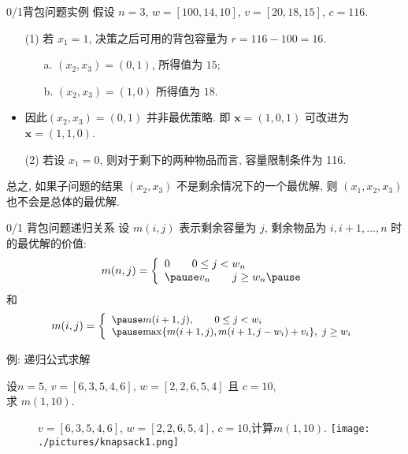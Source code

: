 \documentclass[fontset=fandol,UTF8,fleqn]{beamer}
\begin{document}
\begin{frame}{0/1背包问题实例}
  假设 $n=3$, $w=[100,14,10]$, $v=[20,18,15]$, $c=116$.
    \begin{itemize}[<+-|alert@+>]
    \item[(1)] 若 $x_1 =1$, 决策之后可用的背包容量为 $r=116-100=16$. 
      \begin{itemize}[<+-|alert@+>]
      \item[a.] $(x_2,x_3)=(0,1)$, 所得值为 $15$;
      \item[b.] $(x_2,x_3)=(1, 0)$ 所得值为 $18$.
      \end{itemize}
\item 因此$(x_2,x_3)=(0,1)$ 并非最优策略. 即 $\mathbf{x}=(1,0,1)$ 可改进为 $\mathbf{x}=(1,1,0)$. 
\item[(2)] 若设 $x_1 =0$, 则对于剩下的两种物品而言, 容量限制条件为
  116.
\end{itemize}\pause
 总之, 如果子问题的结果 $(x_2,x_3)$ 不是剩余情况下的一个最优解, 则 $(x_1, x_2, x_3)$ 也不会是总体的最优解. 
\end{frame}

\begin{frame}{0/1 背包问题递归关系}
设 $m(i,j)$ 表示剩余容量为 $j$, 剩余物品为 $i,i+1,\ldots, n$ 时的最优解的价值:  \pause
\begin{eqnarray}
  m(n,j)=\left\{\begin{array}{ll}
0 \qquad 0\leq j < w_n  \\ \pause
v_n \qquad j \geq w_n   \pause
\end{array}\right.
\end{eqnarray} 
和
\begin{eqnarray}
\small{
  m(i,j)=\left\{\begin{array}{ll} \pause
m(i+1, j), \qquad 0\leq j < w_i \\  \pause
\mathrm{max}\{m(i+1,j), m(i+1, j-w_i)+v_i\},\  j\geq w_i    
\end{array}\right.
}
\end{eqnarray}
\end{frame}

\begin{frame}{例: 递归公式求解}
\begin{exampleblock}{}
 设$n=5$, $v=[6,3,5,4,6]$, $w=[2,2,6,5,4]$ 且 $c=10$, \\ 求 $m(1,10)$. 
\end{exampleblock}
\end{frame}

\begin{frame}{}
\begin{figure}
  \centering
$v=[6,3,5,4,6]$, $w=[2,2,6,5,4]$, $c=10$,计算$m(1,10)$.
  \texttt{[image: ./pictures/knapsack1.png]}%
\end{figure}
\end{frame}
\end{document}
